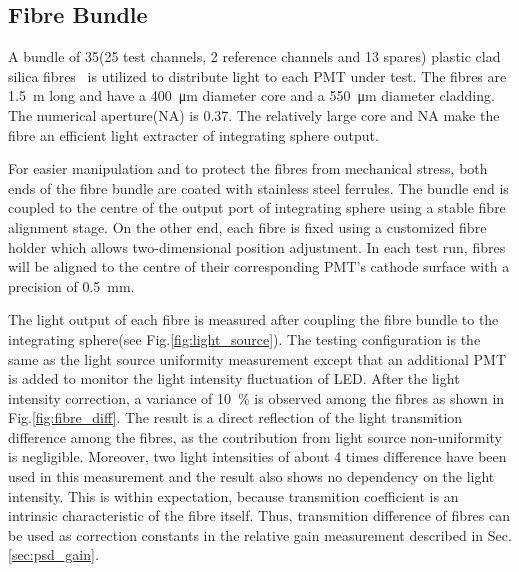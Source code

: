 \documentclass[review,number,sort&compress]{elsarticle}
\begin{document}

\subsection{Fibre Bundle}
\label{sec:fibre_bundle}

A bundle of 35(25 test channels, 2 reference channels and 13 spares) plastic clad silica fibres~\cite{optical_fibre} is utilized to distribute light to each PMT under test.
The fibres are \SI{1.5}{\meter} long and have a \SI{400}{\micro\meter} diameter core and a \SI{550}{\micro\meter} diameter cladding.
The numerical aperture(NA) is 0.37.
The relatively large core and NA make the fibre an efficient light extracter of integrating sphere output. 

For easier manipulation and to protect the fibres from mechanical stress, both ends of the fibre bundle are coated with stainless steel ferrules.
The bundle end is coupled to the centre of the output port of integrating sphere using a stable fibre alignment stage.
On the other end, each fibre is fixed using a customized fibre holder which allows two-dimensional position adjustment.
In each test run, fibres will be aligned to the centre of their corresponding PMT's cathode surface with a precision of \SI{0.5}{\milli\meter}.  

The light output of each fibre is measured after coupling the fibre bundle to the integrating sphere(see Fig.\ref{fig:light_source}).
The testing configuration is the same as the light source uniformity measurement except that an additional PMT is added to monitor the light intensity fluctuation of LED.
After the light intensity correction, a variance of \SI{10}{\percent} is observed among the fibres as shown in Fig.\ref{fig:fibre_diff}.
The result is a direct reflection of the light transmition difference among the fibres, as the contribution from light source non-uniformity is negligible.
Moreover, two light intensities of about 4 times difference have been used in this measurement and the result also shows no dependency on the light intensity. 
This is within expectation, because transmition coefficient is an intrinsic characteristic of the fibre itself.
Thus, transmition difference of fibres can be used as correction constants in the relative gain measurement described in Sec.\ref{sec:psd_gain}.
\end{document}
